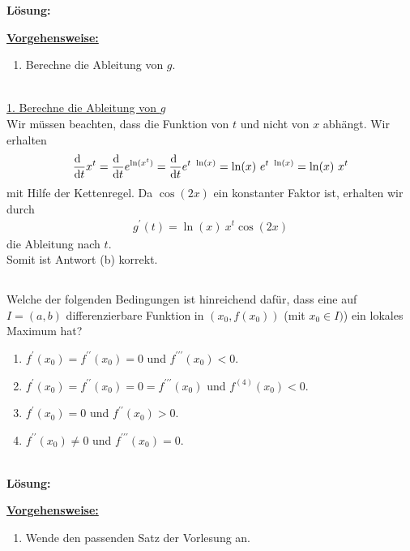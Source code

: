\textbf{Lösung:}
\begin{mdframed}
\underline{\textbf{Vorgehensweise:}}
\renewcommand{\labelenumi}{\theenumi.}
\begin{enumerate}
\item Berechne die Ableitung von $g$.
\end{enumerate}
\end{mdframed}
\ \\
\underline{1. Berechne die Ableitung von $g$}\\
Wir müssen beachten, dass die Funktion von $t$ und nicht von $x$ abhängt.
Wir erhalten
\begin{align*}
\frac{\text{\rmfamily d}  \ }{\text{\rmfamily d} t} x^t = \frac{\text{\rmfamily d}  \ }{\text{\rmfamily d} t} e^{\ln(x^t)}
= \frac{\text{\rmfamily d}  \ }{\text{\rmfamily d} t} e^{t \ \ln(x)}
= \ln(x) \ e^{t \ \ln(x)}
= \ln(x) \ x^t
\end{align*}
mit Hilfe der Kettenregel.
Da $\cos(2x)$ ein konstanter Faktor ist, erhalten wir durch
\begin{align*}
g^\prime(t)
= \ln(x) \ x^t \cos(2x)
\end{align*}
die Ableitung nach $t$.
\\
Somit ist Antwort (b) korrekt.

\newpage

\subsection*{}
Welche der folgenden Bedingungen ist hinreichend dafür, dass eine auf $I=(a,b)$ differenzierbare Funktion in
$(x_0,f(x_0))$ (mit $x_0 \in I)$) ein lokales Maximum hat?
\renewcommand{\labelenumi}{(\alph{enumi})}
\begin{enumerate}
\item $f^\prime(x_0) = f^{\prime \prime}(x_0) = 0$ und $f^{\prime \prime \prime}(x_0) < 0$.
\item $f^\prime(x_0) = f^{\prime \prime}(x_0) = 0 = f^{\prime \prime \prime}(x_0) $ und $f^{(4)}(x_0)<0$.
\item $f^\prime(x_0)=0$ und $f^{\prime \prime}(x_0) >0$.
\item $f^{\prime \prime}(x_0) \neq 0$ und $f^{\prime \prime \prime}(x_0)=0$.
\end{enumerate}
\ \\
\textbf{Lösung:}
\begin{mdframed}
\underline{\textbf{Vorgehensweise:}}
\renewcommand{\labelenumi}{\theenumi.}
\begin{enumerate}
\item Wende den passenden Satz der Vorlesung an.
\end{enumerate}
\end{mdframed}


